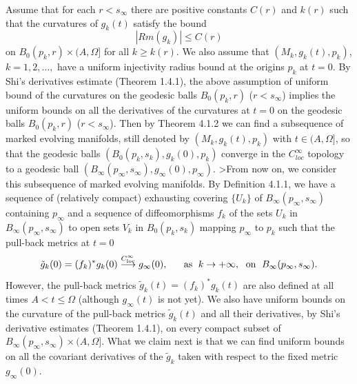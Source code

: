 Assume that for each $r < s_{\infty}$ there are positive constants
$C(r)$ and $k(r)$ such that the curvatures of $g_k(t)$ satisfy the
bound
$$
|Rm(g_k)| \leq C(r)
$$
on $B_0(p_k,r) \times (A,\Omega]$ for all $k \geq k(r).$ We also
assume that $(M_k,g_k(t),p_k)$, $k=1, 2, \ldots,$ have a uniform
injectivity radius bound at the origins $p_k$ at $t=0$. By Shi's
derivatives estimate (Theorem 1.4.1), the above assumption of
uniform bound of the curvatures on the geodesic balls $B_0(p_k,r)$
($r < s_{\infty}$) implies the uniform bounds on all the
derivatives of the curvatures at $t=0$ on the geodesic balls
$B_0(p_k,r)$ ($r < s_{\infty}$). Then by Theorem 4.1.2 we can find
a subsequence of marked evolving manifolds, still denoted by
$(M_k,g_k(t),p_k)$ with $t\in(A,\Omega]$, so that the geodesic
balls $(B_0(p_k,s_k),g_k(0),p_k)$ converge in the $C^\infty_{loc}$
topology to a geodesic ball
$(B_{\infty}(p_{\infty},s_{\infty}),g_{\infty}(0),p_{\infty})$.
>From now on, we consider this subsequence of marked evolving
manifolds.  By Definition 4.1.1, we have a sequence of (relatively
compact) exhausting covering $\{U_k\}$ of
$B_{\infty}(p_{\infty},s_{\infty})$ containing $p_{\infty}$ and a
sequence of diffeomorphisms $f_k$ of the sets $U_k$ in
$B_{\infty}(p_{\infty},s_{\infty})$ to open sets $V_k$ in
$B_{0}(p_{k},s_{k})$ mapping $p_{\infty}$ to $p_k$ such that the
pull-back metrics at $t=0$
$$
\tilde{g}_k(0)=(f_k)^*g_k(0) \stackrel{C_{\rm
loc}^\infty}{\longrightarrow}g_{\infty}(0),\ \quad \text{ as }\;
k\rightarrow+\infty,\; \text{ on }\;
B_{\infty}(p_{\infty},s_{\infty}).
$$
However, the pull-back metrics $\tilde{g}_k(t)=(f_k)^*g_k(t)$ are
also defined at all times $A<t \leq \Omega$ (although
$g_{\infty}(t)$ is not yet). We also have uniform bounds on the
curvature of the pull-back metrics $\tilde{g}_k(t)$ and all their
derivatives, by Shi's derivative estimates (Theorem 1.4.1), on
every compact subset of $B_{\infty}(p_{\infty},s_{\infty}) \times
(A,\Omega]$. What we claim next is that we can find uniform bounds
on all the covariant derivatives of the $\tilde{g}_k$ taken with
respect to the fixed metric $g_{\infty}(0)$.

